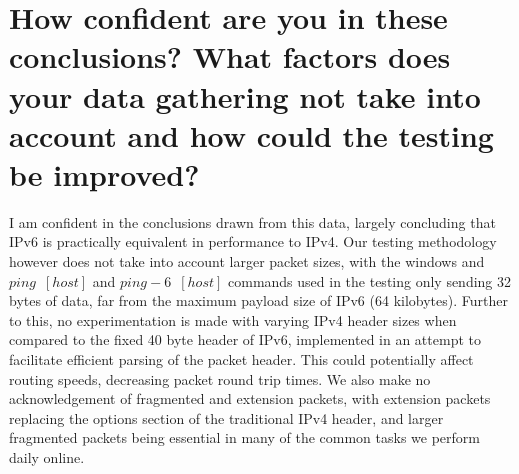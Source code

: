 \section{How confident are you in these conclusions? What factors does your data gathering not take into account and how could the testing be improved?}
\begin{normalsize}
I am confident in the conclusions drawn from this data, largely concluding that IPv6 is practically equivalent in performance to IPv4. Our testing methodology however does not take into account larger packet sizes, with the windows and $ping \enspace [host] $ and $ping -6 \enspace [host]$ commands used in the testing only sending 32 bytes of data, far from the maximum payload size of IPv6 (64 kilobytes). Further to this, no experimentation is made with varying IPv4 header sizes when compared to the fixed 40 byte header of IPv6, implemented in an attempt to facilitate efficient parsing of the packet header. This could potentially affect routing speeds, decreasing packet round trip times. We also make no acknowledgement of fragmented and extension packets, with extension packets replacing the options section of the traditional IPv4 header, and larger fragmented packets being essential in many of the common tasks we perform daily online. 
\end{normalsize}

